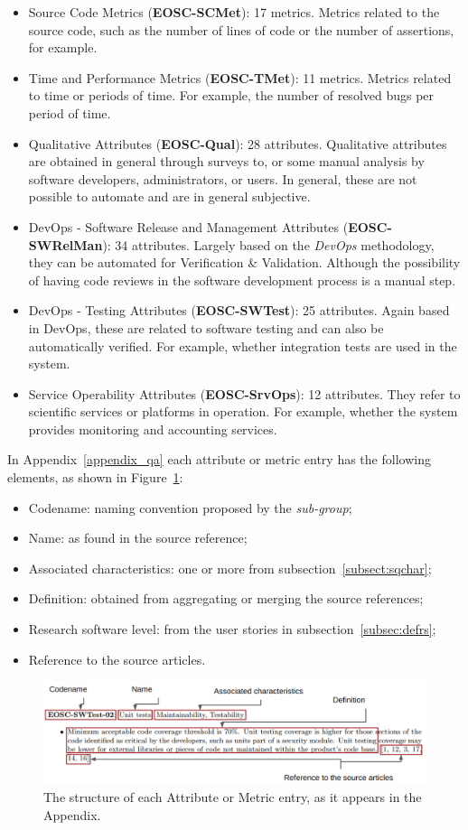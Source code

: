 \begin{itemize}
    \item Source Code Metrics (\textbf{EOSC-SCMet}): 17 metrics. Metrics related to the source code, such as the number of lines of code or the number of assertions, for example.

    \item Time and Performance Metrics (\textbf{EOSC-TMet}): 11 metrics. Metrics related to time or periods of time. For example, the number of resolved bugs per period of time.

    \item Qualitative Attributes (\textbf{EOSC-Qual}): 28 attributes. Qualitative attributes are obtained in general through surveys to, or some manual analysis by software developers, administrators, or users. In general, these are not possible to automate and are in general subjective.

    \item DevOps - Software Release and Management Attributes (\textbf{EOSC-SWRelMan}): 34 attributes. Largely based on the \textit{DevOps} methodology, they can be automated for Verification \& Validation. Although the possibility of having code reviews in the software development process is a manual step.

    \item DevOps - Testing Attributes (\textbf{EOSC-SWTest}): 25 attributes. Again based in DevOps, these are related to software testing and can also be automatically verified. For example, whether integration tests are used in the system.

    \item Service Operability Attributes (\textbf{EOSC-SrvOps}): 12 attributes. They refer to scientific services or platforms in operation. For example, whether the system provides monitoring and accounting services.
\end{itemize}

In Appendix~\ref{appendix_qa} each attribute or metric entry has the following elements, as shown in Figure~\ref{fig:sqattr}:

\begin{itemize}
    \item Codename: naming convention proposed by the \textit{sub-group};
    \item Name: as found in the source reference;
    \item Associated characteristics: one or more from subsection~\ref{subsect:sqchar};
    \item Definition: obtained from aggregating or merging the source references;
    \item Research software level: from the user stories in subsection~\ref{subsec:defrs};
    \item Reference to the source articles.
\end{itemize}

\begin{figure}[h]
    \centering
    \includegraphics[width=0.99\linewidth]{imgs/qa.png}
    \caption{The structure of each Attribute or Metric entry, as it appears in the Appendix.}
    \label{fig:sqattr}
\end{figure}
